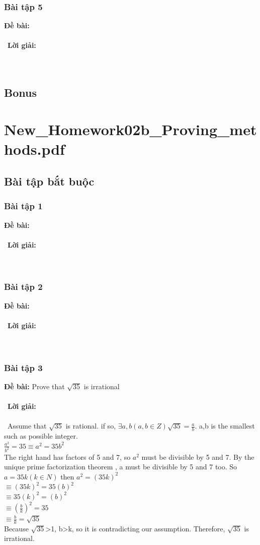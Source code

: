 \documentclass[a4paper]{article}
\begin{document}
\clearpage
\subsubsection{Bài tập 5}
\textbf{Đề bài:} 
\\\ \\\
\textbf{Lời giải:} \\\ \\\
\clearpage

\subsection{Bonus}
\clearpage

\section{New\_Homework02b\_Proving\_methods.pdf}
\subsection{Bài tập bắt buộc}
\subsubsection{Bài tập 1}
\textbf{Đề bài:} 
\\\ \\\
\textbf{Lời giải:} \\\ \\\
\clearpage
\subsubsection{Bài tập 2}
\textbf{Đề bài:} 
\\\ \\\
\textbf{Lời giải:} \\\ \\\
\clearpage
\subsubsection{Bài tập 3}
\textbf{Đề bài:} Prove that $\sqrt{35}$ is irrational 
\\\ \\\
\textbf{Lời giải:} \\\ \\\
Assume that $\sqrt{35}$ is rational. if so, $\exists a,b (a,b \in Z) \sqrt{35}=\frac{a}{b}$. a,b is the smallest such as possible integer.\\
	$\frac{a^{2}}{b^{2}}=35 \equiv a^{2}=35b^{2}$\\
	The right hand has factors of 5 and 7, so $a^{2}$ must be divisible by 5 and 7. By the unique prime factorization theorem , a must be divisible by 5 and 7 too. So $a=35k (k \in N)$ then $a^{2}=(35k)^{2}$\\
	$\equiv (35k)^{2}=35(b)^{2}$\\
	$\equiv 35(k)^{2}=(b)^{2}$\\
	$\equiv (\frac{b}{k})^{2}=35$\\
	$\equiv \frac{b}{k}=\sqrt{35}$\\
	Because $\sqrt{35}$>1, b>k, so it is contradicting our assumption. Therefore, $\sqrt{35}$ is irrational. 
\clearpage
\end{document}
